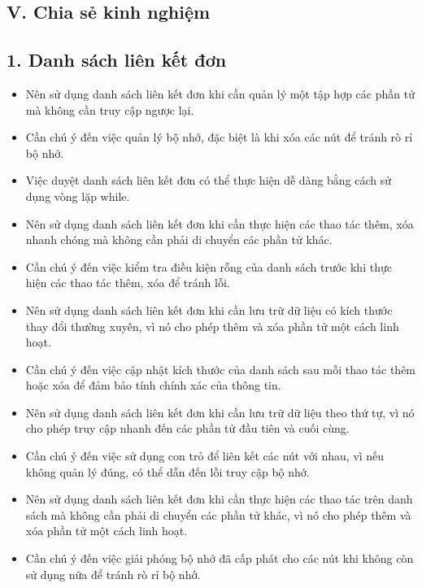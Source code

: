 \subsection*{V. Chia sẻ kinh nghiệm}
\subsection*{1. Danh sách liên kết đơn}
\begin{itemize}
    \item Nên sử dụng danh sách liên kết đơn khi cần quản lý một tập hợp các phần tử mà không cần truy cập ngược lại.
    \item Cần chú ý đến việc quản lý bộ nhớ, đặc biệt là khi xóa các nút để tránh rò rỉ bộ nhớ.
    \item Việc duyệt danh sách liên kết đơn có thể thực hiện dễ dàng bằng cách sử dụng vòng lặp while.
    \item Nên sử dụng danh sách liên kết đơn khi cần thực hiện các thao tác thêm, xóa nhanh chóng mà không cần phải di chuyển các phần tử khác.
    \item Cần chú ý đến việc kiểm tra điều kiện rỗng của danh sách trước khi thực hiện các thao tác thêm, xóa để tránh lỗi.
    \item Nên sử dụng danh sách liên kết đơn khi cần lưu trữ dữ liệu có kích thước thay đổi thường xuyên, vì nó cho phép thêm và xóa phần tử một cách linh hoạt.
    \item Cần chú ý đến việc cập nhật kích thước của danh sách sau mỗi thao tác thêm hoặc xóa để đảm bảo tính chính xác của thông tin.
    \item Nên sử dụng danh sách liên kết đơn khi cần lưu trữ dữ liệu theo thứ tự, vì nó cho phép truy cập nhanh đến các phần tử đầu tiên và cuối cùng.
    \item Cần chú ý đến việc sử dụng con trỏ để liên kết các nút với nhau, vì nếu không quản lý đúng, có thể dẫn đến lỗi truy cập bộ nhớ.
    \item Nên sử dụng danh sách liên kết đơn khi cần thực hiện các thao tác trên danh sách mà không cần phải di chuyển các phần tử khác, vì nó cho phép thêm và xóa phần tử một cách linh hoạt.
    \item Cần chú ý đến việc giải phóng bộ nhớ đã cấp phát cho các nút khi không còn sử dụng nữa để tránh rò rỉ bộ nhớ.
\end{itemize}
